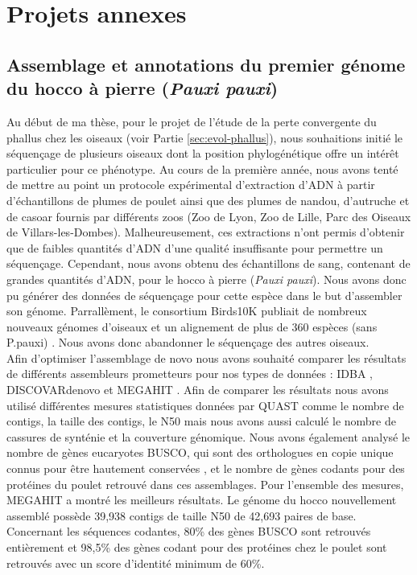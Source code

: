 \chapter{Projets annexes}
{\hypersetup{linkcolor=GREYDARK}\minitoc}
\label{chap:projets-annexes}

\section{Assemblage et annotations du premier génome du hocco à pierre (\textit{Pauxi pauxi})}
\label{annexe:hocco}

Au début de ma thèse, pour le projet de l'étude de la perte convergente du phallus chez les oiseaux (voir Partie \ref{sec:evol-phallus}), nous souhaitions initié le séquençage de plusieurs oiseaux dont la position phylogénétique offre un intérêt particulier pour ce phénotype. Au cours de la première année, nous avons tenté de mettre au point un protocole expérimental d’extraction d’ADN à partir d’échantillons de plumes de poulet ainsi que des plumes de nandou, d’autruche et de casoar fournis par différents zoos (Zoo de Lyon, Zoo de Lille, Parc des Oiseaux de Villars-les-Dombes). Malheureusement, ces extractions n’ont permis d’obtenir que de faibles quantités d’ADN d’une qualité insuffisante pour permettre un séquençage. Cependant, nous avons obtenu des échantillons de sang, contenant de grandes quantités d’ADN, pour le hocco à pierre (\textit{Pauxi pauxi}). Nous avons donc pu générer des données de séquençage pour cette espèce dans le but d'assembler son génome. Parrallèment, le consortium Birds10K publiait de nombreux nouveaux génomes d'oiseaux et un alignement de plus de 360 espèces (sans P.pauxi) \citep{feng_dense_2020}. Nous avons donc abandonner le séquençage des autres oiseaux.\\

Afin d’optimiser l’assemblage de novo nous avons souhaité comparer les résultats de différents assembleurs prometteurs pour nos types de données : IDBA \citep{peng_idba_2010},  DISCOVARdenovo \citep{weisenfeld_comprehensive_2014} et MEGAHIT \citep{li_megahit_2015}. Afin de comparer les résultats nous avons utilisé différentes mesures statistiques données par QUAST \citep{gurevich_quast_2013} comme le nombre de contigs, la taille des contigs, le N50 mais nous avons aussi calculé le nombre de cassures de synténie et la couverture génomique. Nous avons également analysé le nombre de gènes eucaryotes BUSCO, qui sont des orthologues en copie unique connus pour être hautement conservées \citep{simao_busco_2015}, et le nombre de gènes codants pour des protéines du poulet retrouvé dans ces assemblages. Pour l’ensemble des mesures, MEGAHIT a montré les meilleurs résultats. Le génome du hocco nouvellement assemblé possède 39,938 contigs de taille N50 de 42,693 paires de base. Concernant les séquences codantes, 80\% des gènes BUSCO sont retrouvés entièrement et 98,5\% des gènes codant pour des protéines chez le poulet sont retrouvés avec un score d’identité minimum de 60\%. \\

